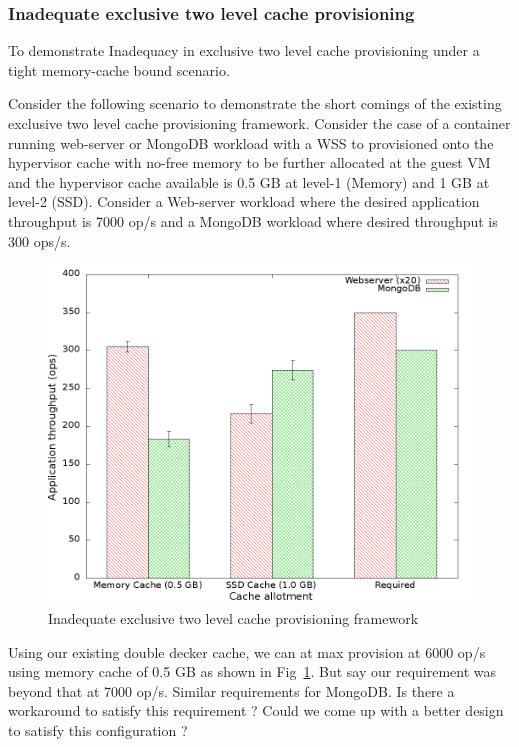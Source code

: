 	\subsubsection{Inadequate exclusive two level cache provisioning}
	\label{sec:dd_hybrid_motivation}
	  
	    To demonstrate Inadequacy in exclusive two level cache provisioning under a tight memory-cache bound
	    scenario.  
	    
	    Consider the following scenario to demonstrate the short comings of the existing exclusive two level cache
	    provisioning framework. Consider the case of a container running web-server or MongoDB workload
	    with a WSS to provisioned onto the hypervisor cache with  no-free memory to be further allocated 
	    at the guest VM and the hypervisor cache available is 0.5 GB at level-1 (Memory) and 1 GB at 
	    level-2 (SSD). Consider a Web-server workload where the desired application throughput is 7000 op/s
	    and a MongoDB workload where desired throughput is 300 ops/s.
	    
	  \begin{figure}
	    \centering
	    \includegraphics[scale=0.35]{images/dd_hybrid_motivation/throughput.png}
	    \caption{Inadequate exclusive two level cache provisioning framework}
	    \label{plot:dd_hybrid_motivation}
	  \end{figure}
	  
	    Using our existing double decker cache, we can at max provision at 6000 op/s using memory cache of 0.5 GB as 
	    shown in Fig~\ref{plot:dd_hybrid_motivation}. But say our requirement was beyond that at 7000 op/s. Similar
	    requirements for MongoDB. Is there a workaround to satisfy this requirement ? Could we come up with a 
	    better design to satisfy this configuration ?
	    
